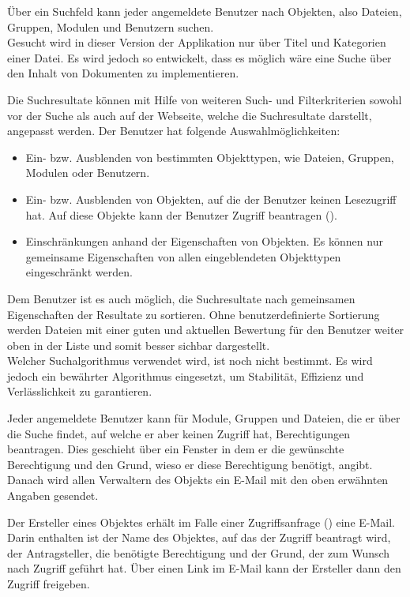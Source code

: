 Über ein Suchfeld kann jeder angemeldete Benutzer nach Objekten, also Dateien, Gruppen, Modulen und Benutzern suchen.\\
Gesucht wird in dieser Version der Applikation nur über Titel und Kategorien einer Datei. Es wird jedoch so entwickelt, dass es möglich wäre eine Suche über den Inhalt von Dokumenten zu implementieren.

Die Suchresultate können mit Hilfe von weiteren Such- und Filterkriterien sowohl vor der Suche als auch auf der Webseite, welche die Suchresultate darstellt, angepasst werden. Der Benutzer hat folgende Auswahlmöglichkeiten:
\begin{itemize}
\item Ein- bzw. Ausblenden von bestimmten Objekttypen, wie Dateien, Gruppen, Modulen oder Benutzern.
\item Ein- bzw. Ausblenden von Objekten, auf die der Benutzer keinen Lesezugriff hat. Auf diese Objekte kann der Benutzer Zugriff beantragen (). 
\item Einschränkungen anhand der Eigenschaften von Objekten. Es können nur gemeinsame Eigenschaften von allen eingeblendeten Objekttypen eingeschränkt werden.
\end{itemize}
Dem Benutzer ist es auch möglich, die Suchresultate nach gemeinsamen Eigenschaften der Resultate zu sortieren. Ohne benutzerdefinierte Sortierung werden Dateien mit einer guten und aktuellen Bewertung für den Benutzer weiter oben in der Liste und somit besser sichbar dargestellt.\\
Welcher Suchalgorithmus verwendet wird, ist noch nicht bestimmt. Es wird jedoch ein bewährter Algorithmus eingesetzt, um Stabilität, Effizienz und Verlässlichkeit zu garantieren.

Jeder angemeldete Benutzer kann für Module, Gruppen und Dateien, die er über die Suche findet, auf welche er aber keinen Zugriff hat, Berechtigungen beantragen. Dies geschieht über ein Fenster in dem er die gewünschte Berechtigung und den Grund, wieso er diese Berechtigung benötigt, angibt. Danach wird allen Verwaltern des Objekts ein E-Mail mit den oben erwähnten Angaben gesendet.

Der Ersteller eines Objektes erhält im Falle einer Zugriffsanfrage () eine E-Mail. Darin enthalten ist der Name des Objektes, auf das der Zugriff beantragt wird, der Antragsteller, die benötigte Berechtigung und der Grund, der zum Wunsch nach Zugriff geführt hat. Über einen Link im E-Mail kann der Ersteller dann den Zugriff freigeben.
